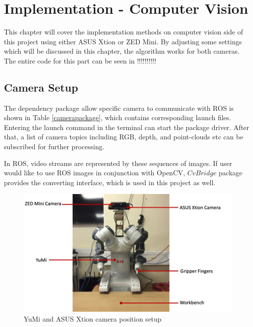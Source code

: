 \chapter{Implementation - Computer Vision}

This chapter will cover the implementation methods on computer vision side of this project using either ASUS Xtion or ZED Mini. By adjusting some settings which will be discussed in this chapter, the algorithm works for both cameras. The entire code for this part can be seen in !!!!!!!!!!

\section{Camera Setup}
The dependency package allow specific camera to communicate with ROS is shown in Table \ref{camerapackage}, which contains corresponding launch files. Entering the launch command in the terminal can start the package driver. After that, a list of camera topics including RGB, depth, and point-clouds etc can be subscribed for further processing. 

\begin{table}[H]
\centering
{}
\caption{The dependency packages and launch commands for Cameras}
\label{camerapackage}
\end{table}

In ROS, video streams are represented by these sequences of images. If user would like to use ROS images in conjunction with OpenCV, $CvBridge$ package provides the converting interface, which is used in this project as well.

\begin{figure}[H]
\centering
\includegraphics[width = \columnwidth]{Implementation/cv/yumicamera.jpg}
\caption{YuMi and ASUS Xtion camera position setup}
\label{5.1}
\end{figure}

